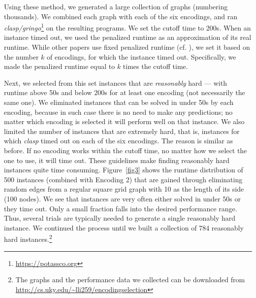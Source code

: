 \documentclass{new_tlp}
\begin{document}
Using these method, we generated a large collection of graphs (numbering
thousands). We combined each graph with each of the six encodings, and ran 
\emph{clasp/gringo}\footnote{\url{https://potassco.org}} on the resulting 
programs. We set the cutoff time to 200s. 
When an instance timed out, we used the penalized runtime as an approximation 
of its real runtime. While other papers use fixed penalized runtime (cf.
\cite{HoosLS14}), we set it based on the number $k$ of encodings,
for which the instance timed out. Specifically, we made the penalized runtime 
equal to $k$ times the cutoff time.

Next, we selected from this set instances that are \emph{reasonably} hard --- 
with runtime above 50s and below 200s for at least one encoding (not 
necessarily the same one). We eliminated instances that can be solved in 
under 50s by each encoding, because in such case there is no need to make 
any predictions; no matter which encoding is selected it will perform well 
on that instance. We also limited the number of instances that are extremely 
hard, that is, instances for which \emph{clasp} timed out on each of the 
six encodings. The reason is similar as before. If no encoding works within 
the cutoff time, no matter how we select the one to use, it will time out. 
These guidelines make finding reasonably hard instances quite time consuming. 
Figure~\ref{fig3} shows the runtime distribution of 500 instances (combined 
with Encoding 2) that are gained through eliminating random edges from a 
regular square grid graph with 10 as the length of its side (100 nodes). 
We see that instances are very often either solved in under 50s or they time 
out. Only a small fraction falls into the desired performance range. Thus,
several trials are typically needed to generate a single reasonably hard 
instance. We continued the process until we built a collection of 784 
reasonably hard instances.\footnote{The graphs and the performance data we 
collected can be downloaded from \url{http://cs.uky.edu/~lli259/encodingselection}}
\end{document}
